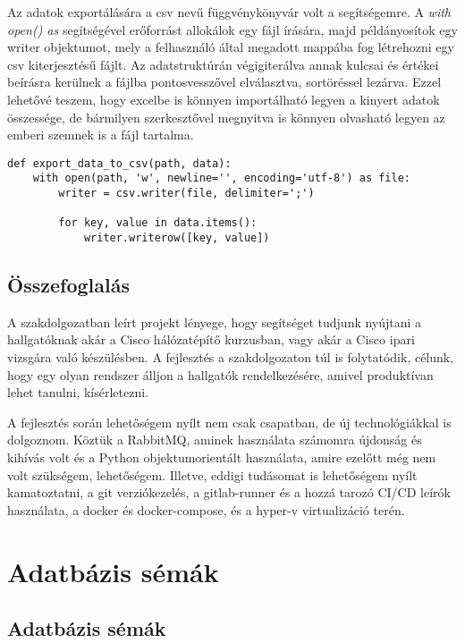\documentclass[12pt]{report}
\begin{document}
Az adatok exportálására a csv nevű függvénykönyvár volt a segítségemre. A \emph{with open() as} segítségével erőforrást allokálok egy fájl írására, majd példányosítok egy writer objektumot, mely a felhasználó által megadott mappába fog létrehozni egy csv kiterjesztésű fájlt. Az adatstruktúrán végigiterálva annak kulcsai és értékei beírásra kerülnek a fájlba pontosvesszővel elválasztva, sortöréssel lezárva. Ezzel lehetővé teszem, hogy excelbe is könnyen importálható legyen a kinyert adatok összessége, de bármilyen szerkesztővel megnyitva is könnyen olvasható legyen az emberi szemnek is a fájl tartalma.

\begin{verbatim}
def export_data_to_csv(path, data):
    with open(path, 'w', newline='', encoding='utf-8') as file:
        writer = csv.writer(file, delimiter=';')

        for key, value in data.items():
            writer.writerow([key, value])
\end{verbatim}

\section{Összefoglalás}

A szakdolgozatban leírt projekt lényege, hogy segítséget tudjunk nyújtani a hallgatóknak akár a Cisco hálózatépítő kurzusban, vagy akár a Cisco ipari vizsgára való készülésben. A fejlesztés a szakdolgozaton túl is folytatódik, célunk, hogy egy olyan rendszer álljon a hallgatók rendelkezésére, amivel produktívan lehet tanulni, kísérletezni.


A fejlesztés során lehetőségem nyílt nem csak csapatban, de új technológiákkal is dolgoznom. Köztük a RabbitMQ, aminek használata számomra újdonság és kihívás volt és a Python objektumorientált használata, amire ezelőtt még nem volt szükségem, lehetőségem. Illetve, eddigi tudásomat is lehetőségem nyílt kamatoztatni, a git verziókezelés, a gitlab-runner és a hozzá tarozó CI/CD leírók használata, a docker és docker-compose, és a hyper-v virtualizáció terén.

\chapter{Adatbázis sémák}
\section{Adatbázis sémák}
\end{document}
